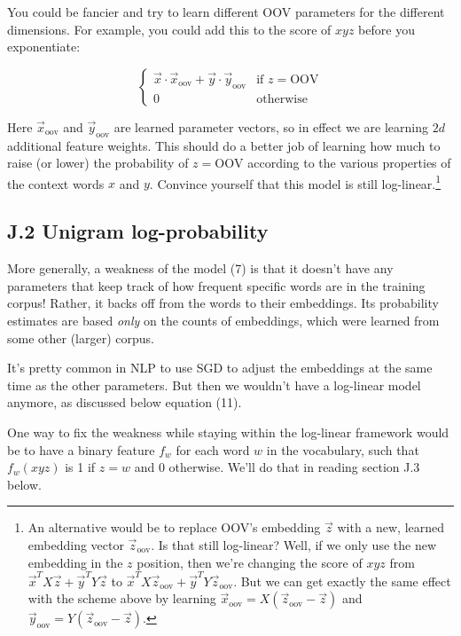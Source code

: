 You could be fancier and try to learn different OOV parameters for the different dimensions. For example, 
you could add this to the score of $xyz$ before you exponentiate: 

\[
\begin{cases}
\vec{x}\cdot \vec{x}_{\text{oov}} + \vec{y}\cdot \vec{y}_{\text{oov}} & \text{if } z = \text{OOV} \\
0 & \text{otherwise}
\end{cases} \tag{25}
\]

Here $\vec{x}_{\text{oov}}$ and $\vec{y}_{\text{oov}}$ are learned parameter vectors, so in effect we are learning $2d$ additional feature weights. 
This should do a better job of learning how much to raise (or lower) the probability of $z = \text{OOV}$ according 
to the various properties of the context words $x$ and $y$. Convince yourself that this model is still log-linear.\footnote{An alternative would be to replace OOV’s embedding $\vec{z}$ with a new, learned embedding vector $\vec{z}_{\text{oov}}$. Is that still log-linear? Well, if we only use the new embedding in the $z$ position, then we’re changing the score of $xyz$ from $\vec{x}^TX\vec{z} + \vec{y}^TY\vec{z}$ to $\vec{x}^TX\vec{z}_{\text{oov}} + \vec{y}^TY\vec{z}_{\text{oov}}$. But we can get exactly the same effect with the scheme above by learning $\vec{x}_{\text{oov}} = X(\vec{z}_{\text{oov}} - \vec{z})$ and $\vec{y}_{\text{oov}} = Y(\vec{z}_{\text{oov}} - \vec{z})$.}

\subsection*{J.2 Unigram log-probability}

More generally, a weakness of the model (7) is that it doesn’t have any parameters that keep track of how 
frequent specific words are in the training corpus! Rather, it backs off from the words to their embeddings. 
Its probability estimates are based \emph{only} on the counts of embeddings, which were learned from some other (larger) 
corpus. 

It’s pretty common in NLP to use SGD to adjust the embeddings at the same time as the other parameters. 
But then we wouldn’t have a log-linear model anymore, as discussed below equation (11). 

One way to fix the weakness while staying within the log-linear framework would be to have a binary 
feature $f_w$ for each word $w$ in the vocabulary, such that $f_w(xyz)$ is 1 if $z=w$ and 0 otherwise. We’ll do 
that in reading section J.3 below. 

